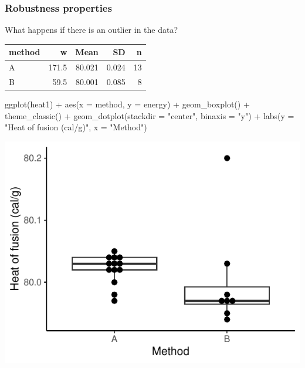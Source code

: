 \documentclass[a4paper]{article}\usepackage[]{graphicx}\usepackage[]{xcolor}
\makeatletter
\def\maxwidth{ %
  \ifdim\Gin@nat@width>\linewidth
    \linewidth
  \else
    \Gin@nat@width
  \fi
}
\makeatother
\begin{document}
\subsubsection{Robustness properties}
What happens if there is an outlier in the data?
\begin{Schunk}
\begin{table}[!h]
\centering
\begin{tabular}{lrrrr}
\toprule
method & w & Mean & SD & n\\
\midrule
A & 171.5 & 80.021 & 0.024 & 13\\
B & 59.5 & 80.001 & 0.085 & 8\\
\bottomrule
\end{tabular}
\end{table}

\end{Schunk}
\begin{Schunk}
\begin{Sinput}
ggplot(heat1) + 
  aes(x = method, y = energy) + 
  geom_boxplot() + 
  theme_classic() +
  geom_dotplot(stackdir = "center",
  	binaxis = "y") +
  labs(y = "Heat of fusion (cal/g)",
    x = "Method")
\end{Sinput}


{\centering \includegraphics[width=\maxwidth]{figure/listings-unnamed-chunk-126-1} 

}

\end{Schunk}
\end{document}
